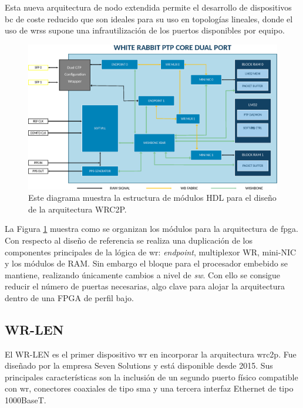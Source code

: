 Esta nueva arquitectura de nodo extendida permite el desarrollo de dispositivos 
\gls{bc} de coste reducido que son ideales para su uso en topologías lineales, 
donde el uso de \gls{wrs}s supone una infrautilización de los puertos 
disponibles por equipo.

\begin{figure}
	\centering
	\includegraphics[width=0.7\linewidth]{imagenes/wrpc_dp}
	\caption[Diagrama de bloques del WRC2P]{Este diagrama muestra la estructura 
	de módulos HDL para el diseño de la arquitectura WRC2P.}
	\label{fig:wrpcdp}
\end{figure}


La Figura \ref{fig:wrpcdp} muestra como se organizan los módulos para la 
arquitectura de \gls{fpga}. Con respecto al diseño de referencia se realiza una 
duplicación de los componentes principales de la lógica de \gls{wr}: 
\textit{endpoint}, multiplexor WR, mini-NIC
y los módulos de RAM. Sin embargo el bloque para el procesador embebido se 
mantiene, realizando únicamente cambios a nivel de \textit{sw}. Con ello se 
consigue reducir el número de puertas necesarias, algo clave para alojar la 
arquitectura dentro de una FPGA de perfil bajo.

\subsection{WR-LEN}

El WR-LEN es el primer dispositivo \gls{wr} en incorporar la arquitectura 
\gls{wrc2p}. Fue diseñado por la empresa Seven Solutions y está disponible 
desde 2015. Sus principales características son la inclusión de un segundo 
puerto físico compatible con \gls{wr}, conectores coaxiales de tipo \gls{sma} y 
una tercera interfaz Ethernet de tipo 1000BaseT.

